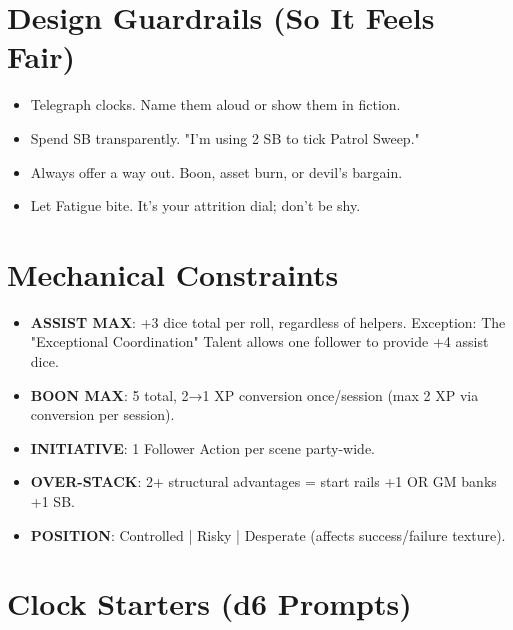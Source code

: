\section{Design Guardrails (So It Feels Fair)}

\begin{itemize}
\item Telegraph clocks. Name them aloud or show them in fiction.
\item Spend SB transparently. "I'm using 2 SB to tick Patrol Sweep."
\item Always offer a way out. Boon, asset burn, or devil's bargain.
\item Let Fatigue bite. It's your attrition dial; don't be shy.
\end{itemize}

\section{Mechanical Constraints}
\begin{itemize}
    \item \textbf{ASSIST MAX}: +3 dice total per roll, regardless of helpers. Exception: The "Exceptional Coordination" Talent allows one follower to provide +4 assist dice.
    \item \textbf{BOON MAX}: 5 total, 2→1 XP conversion once/session (max 2 XP via conversion per session).
    \item \textbf{INITIATIVE}: 1 Follower Action per scene party-wide.
    \item \textbf{OVER-STACK}: 2+ structural advantages = start rails +1 OR GM banks +1 SB.
    \item \textbf{POSITION}: Controlled | Risky | Desperate (affects success/failure texture).
\end{itemize}

\section{Clock Starters (d6 Prompts)}

